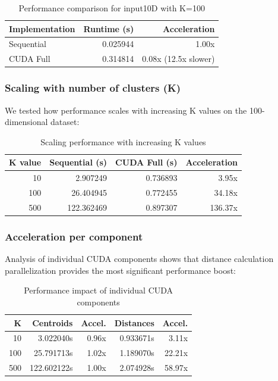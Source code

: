 \documentclass[sigconf]{acmart}
\begin{document}
\begin{table}[h]
\centering
\begin{tabular}{|l|r|r|}
\hline
\textbf{Implementation} & \textbf{Runtime (s)} & \textbf{Acceleration} \\
\hline
Sequential & 0.025944 & 1.00x \\
\hline
CUDA Full & 0.314814 & 0.08x (12.5x slower) \\
\hline
\end{tabular}
\caption{Performance comparison for input10D with K=100}
\end{table}

\subsubsection{Scaling with number of clusters (K)}

We tested how performance scales with increasing K values on the 100-dimensional dataset:

\begin{table}[h]
\centering
\begin{tabular}{|r|r|r|r|}
\hline
\textbf{K value} & \textbf{Sequential (s)} & \textbf{CUDA Full (s)} & \textbf{Acceleration} \\
\hline
10 & 2.907249 & 0.736893 & 3.95x \\
\hline
100 & 26.404945 & 0.772455 & 34.18x \\
\hline
500 & 122.362469 & 0.897307 & 136.37x \\
\hline
\end{tabular}
\caption{Scaling performance with increasing K values}
\end{table}

\subsubsection{Acceleration per component}

Analysis of individual CUDA components shows that distance calculation parallelization provides the most significant performance boost:

\begin{table}[h]
\centering
\begin{tabular}{|r|r|r|r|r|}
\hline
\textbf{K} & \textbf{Centroids} & \textbf{Accel.} & \textbf{Distances} & \textbf{Accel.} \\
\hline
10 & 3.022040s & 0.96x & 0.933671s & 3.11x \\
\hline
100 & 25.791713s & 1.02x & 1.189070s & 22.21x \\
\hline
500 & 122.602122s & 1.00x & 2.074928s & 58.97x \\
\hline
\end{tabular}
\caption{Performance impact of individual CUDA components}
\end{table}
\end{document}
